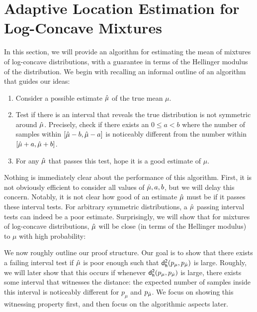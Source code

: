 


\section{Adaptive Location Estimation for Log-Concave Mixtures}

In this section, we will provide an algorithm for estimating the mean of mixtures of log-concave distributions, with a guarantee in terms of the Hellinger modulus of the distribution. We begin with recalling an informal outline of an algorithm that guides our ideas:

\begin{enumerate}
    \item Consider a possible estimate $\hat{\mu}$ of the true mean $\mu$. 
    \item Test if there is an interval that reveals the true distribution is not symmetric around $\hat{\mu}$. Precisely, check if there exists an $0 \le a < b$ where the number of samples within $[\hat{\mu} - b, \hat{\mu} - a]$ is noticeably different from the number within $[\hat{\mu} + a, \hat{\mu} + b]$.
    \item For any $\hat{\mu}$ that passes this test, hope it is a good estimate of $\mu$.
\end{enumerate}

Nothing is immediately clear about the performance of this algorithm. First, it is not obviously efficient to consider all values of $\hat{\mu},a,b$, but we will delay this concern. Notably, it is not clear how good of an estimate $\hat{\mu}$ must be if it passes these interval tests. For arbitrary symmetric distributions, a $\hat{\mu}$ passing interval tests can indeed be a poor estimate. Surprisingly, we will show that for mixtures of log-concave distributions, $\hat{\mu}$ will be close (in terms of the Hellinger modulus) to $\mu$ with high probability:

\fastthm*

We now roughly outline our proof structure. Our goal is to show that there exists a failing interval test if $\hat{\mu}$ is poor enough such that $\mathsf{d_{h}^2}(p_{\mu},p_{\hat{\mu}})$ is large. Roughly, we will later show that this occurs if whenever $\mathsf{d_{h}^2}(p_{\mu},p_{\hat{\mu}})$ is large, there exists some interval that witnesses the distance: the expected number of samples inside this interval is noticeably different for $p_{\mu}$ and $p_{\hat{\mu}}$. We focus on showing this witnessing property first, and then focus on the algorithmic aspects later.

